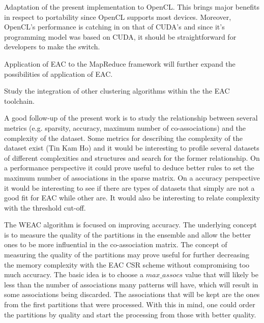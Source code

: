 Adaptation of the present implementation to OpenCL. This brings major benefits in respect to portability since OpenCL supports most devices. Moreover, OpenCL's performance is catching in on that of CUDA's and since it's programming model was based on CUDA, it should be straightforward for developers to make the switch.

Application of EAC to the MapReduce framework will further expand the possibilities of application of EAC.

Study the integration of other clustering algorithms within the the EAC toolchain.

A good follow-up of the present work is to study the relationship between several metrics (e.g. sparsity, accuracy, maximum number of co-associations) and the complexity of the dataset. Some metrics for describing the complexity of the dataset exist (Tin Kam Ho) and it would be interesting to profile several datasets of different complexities and structures and search for the former relationship.
On a performance perspective it could prove useful to deduce better rules to set the maximum number of associations in the sparse matrix.
On a accuracy perspective it would be interesting to see if there are types of datasets that simply are not a good fit for EAC while other are. It would also be interesting to relate complexity with the threshold cut-off.

The WEAC algorithm is focused on improving accuracy.
The underlying concept is to measure the quality of the partitions in the ensemble and allow the better ones to be more influential in the co-association matrix.
The concept of measuring the quality of the partitions may prove useful for further decreasing the memory complexity with the EAC CSR scheme without compromising too much accuracy.
The basic idea is to choose a $max\_assocs$ value that will likely be less than the number of associations many patterns will have, which will result in some associations being discarded.
The associations that will be kept are the ones from the first partitions that were processed.
With this in mind, one could order the partitions by quality and start the processing from those with better quality.


\cleardoublepage

